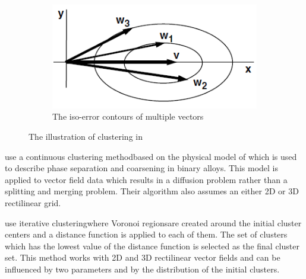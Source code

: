 \begin{figure}[h]
\begin{subfigure}{0.3\textwidth}
    \includegraphics[width=\textwidth]{./img/telea-ellipse-vectors.PNG}
    \caption{The iso-error contours of multiple vectors}
	\end{subfigure}
\caption{The illustration of clustering in \citet{Telea99}}
\label{fig:telea-hierarchical_clustering}
\end{figure}

\citet{Garcke00} use a continuous clustering method\footnotemark based on the physical model of \citet{CahnHilliard58} which is used to describe phase separation and coarsening in binary alloys. This model is applied to vector field data which results in a diffusion problem rather than a splitting and merging problem. Their algorithm also assumes an either 2D or 3D rectilinear grid.


\citet{Du04} use iterative clustering\footnotemark where Voronoi regions\footnotemark are created around the initial cluster centers and a distance function is applied to each of them. The set of clusters which has the lowest value of the distance function is selected as the final cluster set. This method works with 2D and 3D rectilinear vector fields and can be influenced by two parameters and by the distribution of the initial clusters.

\addtocounter{footnote}{-2}

